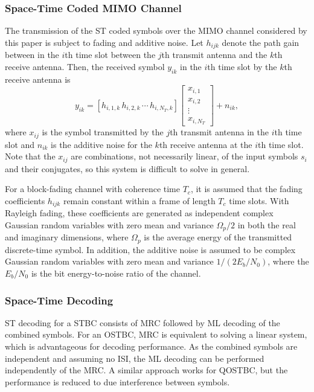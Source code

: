 \subsubsection{Space-Time Coded MIMO Channel}
The transmission of the ST coded symbols over the MIMO channel considered by this paper is subject to fading and additive noise. Let $h_{ijk}$ denote the path gain between in the $i$th time slot between the $j$th transmit antenna and the $k$th receive antenna. Then, the received symbol $y_{ik}$ in the $i$th time slot by the $k$th receive antenna is
\[ y_{ik} = [h_{i,1,k}\,h_{i,2,k}\,\cdots\,h_{i,N_T,k}] \begin{bmatrix} x_{i,1} \\ x_{i,2} \\ \vdots \\ x_{i,N_T} \end{bmatrix} + n_{ik}, \]
where $x_{ij}$ is the symbol transmitted by the $j$th transmit antenna in the $i$th time slot and $n_{ik}$ is the additive noise for the $k$th receive antenna at the $i$th time slot. Note that the $x_{ij}$ are combinations, not necessarily linear, of the input symbols $s_i$ and their conjugates, so this system is difficult to solve in general.

For a block-fading channel with coherence time $T_c$, it is assumed that the fading coefficients $h_{ijk}$ remain constant within a frame of length $T_c$ time slots. With Rayleigh fading, these coefficients are generated as independent complex Gaussian random variables with zero mean and variance $\Omega_p/2$ in both the real and imaginary dimensions, where $\Omega_p$ is the average energy of the transmitted discrete-time symbol. In addition, the additive noise is assumed to be complex Gaussian random variables with zero mean and variance $1/(2E_b/N_0)$, where the $E_b/N_0$ is the bit energy-to-noise ratio of the channel.

\subsubsection{Space-Time Decoding}
ST decoding for a STBC consists of MRC followed by ML decoding of the combined symbols. For an OSTBC, MRC is equivalent to solving a linear system, which is advantageous for decoding performance. As the combined symbols are independent and assuming no ISI, the ML decoding can be performed independently of the MRC. A similar approach works for QOSTBC, but the performance is reduced to due interference between symbols.


